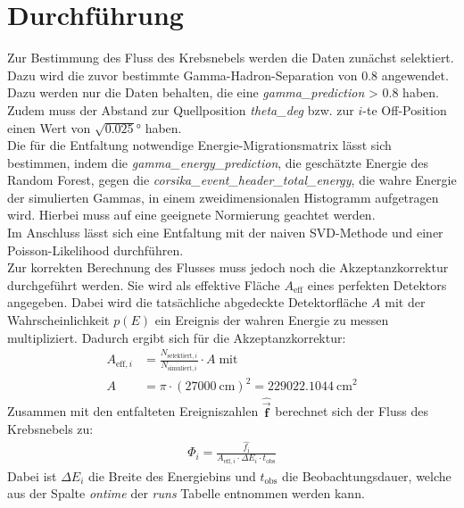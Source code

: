 \section{Durchführung}
Zur Bestimmung des Fluss des Krebsnebels werden die Daten zunächst selektiert. Dazu wird die zuvor bestimmte Gamma-Hadron-Separation von $0.8$ angewendet. Dazu werden nur die Daten behalten, die eine \textit{gamma\_prediction} \textgreater \; $0.8$ haben. Zudem muss der Abstand zur Quellposition \textit{theta\_deg} bzw. zur $i$-te Off-Position einen Wert von $\sqrt{0.025}\si{\degree}$ haben.\\
Die für die Entfaltung notwendige Energie-Migrationsmatrix lässt sich bestimmen, indem die \textit{gamma\_energy\_prediction}, die geschätzte Energie des Random Forest, gegen die \textit{corsika\_event\_header\_total\_energy}, die wahre Energie der simulierten Gammas, in einem zweidimensionalen Histogramm aufgetragen wird. Hierbei muss auf eine geeignete Normierung geachtet werden.\\
Im Anschluss lässt sich eine Entfaltung mit der naiven SVD-Methode und einer Poisson-Likelihood durchführen.\\
Zur korrekten Berechnung des Flusses muss jedoch noch die Akzeptanzkorrektur durchgeführt werden. Sie wird als effektive Fläche $A_{\text{eff}}$ eines perfekten Detektors angegeben. Dabei wird die tatsächliche abgedeckte Detektorfläche $A$ mit der Wahrscheinlichkeit $p(E)$ ein Ereignis der wahren Energie zu messen multipliziert. Dadurch ergibt sich für die Akzeptanzkorrektur:\\
\begin{align}
	A_{\text{eff},i} &= \frac{N_{\text{selektiert},i}}{N_{\text{simuliert},i}} \cdot A \; \text{mit}\\
	A &= \pi \cdot (\SI{27000}{\centi\meter})^2 = \SI{229022.1044}{\centi\meter}^2
	\label{eqn:Aeff}
\end{align}
Zusammen mit den entfalteten Ereigniszahlen $\hat{\vec{\pmb{f}}}$ berechnet sich der Fluss des Krebsnebels zu:
\begin{align}
	\Phi_{i} = \frac{\hat{f_{\mathrm{i}}}}{A_{\text{eff},i} \cdot \Delta E_{i} \cdot t_{\text{obs}} }
	\label{eqn:phi}
\end{align}
Dabei ist $\Delta E_{i}$ die Breite des Energiebins und $t_{\text{obs}}$ die Beobachtungsdauer, welche aus der Spalte \textit{ontime} der \textit{runs} Tabelle entnommen werden kann.
